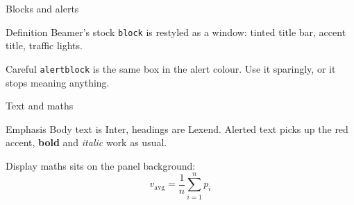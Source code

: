 \begin{frame}{Blocks and alerts}
    \begin{block}{Definition}
        Beamer's stock \texttt{block} is restyled as a window: tinted title
        bar, accent title, traffic lights.
    \end{block}

    \vspace{0.3cm}

    \begin{alertblock}{Careful}
        \texttt{alertblock} is the same box in the alert colour. Use it
        sparingly, or it stops meaning anything.
    \end{alertblock}
\end{frame}

\begin{frame}{Text and maths}
    \begin{panel}{Emphasis}
        Body text is Inter, headings are Lexend. \alert{Alerted text} picks up
        the red accent, \textbf{bold} and \emph{italic} work as usual.

        \vspace{0.2cm}
        Display maths sits on the panel background:
        \[
            v_{\text{avg}} = \frac{1}{n}\sum_{i=1}^{n} p_i
        \]
    \end{panel}
\end{frame}

